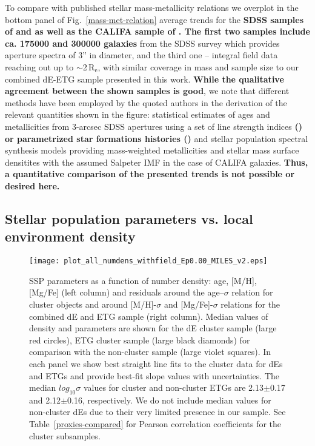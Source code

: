 \documentclass[useAMS,usenatbib]{mn2e}
\newcommand{\re}{$\mathrm{R_e}$}
\newcommand{\sig}{$\sigma$}
\begin{document}
To compare with published stellar mass-metallicity relations we overplot in the bottom panel of Fig.~\ref{mass-met-relation} average trends for the \textbf{SDSS samples of \cite{gallazzi:2005} and \cite{panter:2008} as well as the CALIFA sample of \cite{gonzalezdelgado:2014b}. The first two samples include ca. 175000  and 300000 galaxies} from the SDSS survey which provides aperture spectra of 3'' in diameter, and the third one -- integral field data reaching out up to $\sim$2\,{\re}, with similar coverage in mass and sample size to our combined dE-ETG sample presented in this work. \textbf{While the qualitative agreement between the shown samples is good}, we note that different methods have been employed by the quoted authors in the derivation of the relevant quantities shown in the figure: statistical estimates of ages and metallicities from 3-arcsec SDSS apertures using a set of line strength indices  \textbf{(\citealt{gallazzi:2005}) or parametrized star formations histories (\citealt{panter:2008})} and stellar population spectral synthesis models providing mass-weighted metallicities and stellar mass surface densitites with the assumed Salpeter IMF in the case of CALIFA galaxies. \textbf{Thus, a quantitative comparison of the presented trends is not possible or desired here.} 

\subsection{Stellar population parameters vs. local environment density}

\begin{figure*}
\centering
\texttt{[image: plot\_all\_numdens\_withfield\_Ep0.00\_MILES\_v2.eps]}
\caption{SSP parameters as a function of number density: age, [M/H], [Mg/Fe] (left column) and residuals around the age--{\sig} relation for cluster objects and around [M/H]-{\sig} and [Mg/Fe]-{\sig} relations for the combined dE and ETG sample (right column). Median values of density and parameters are shown for the dE cluster sample (large red circles), ETG cluster sample (large black diamonds) for comparison with the non-cluster sample (large violet squares). In each panel we show best straight line fits to the cluster data for dEs and ETGs and provide best-fit slope values with uncertainties. The median $log_{10}${\sig} values for cluster and non-cluster ETGs are 2.13$\pm$0.17 and 2.12$\pm$0.16, respectively. We do not include median values for non-cluster dEs due to their very limited presence in our sample. See Table~\ref{proxies-compared} for Pearson correlation coefficients for the cluster subsamples.}
\label{density_relations}  
\end{figure*}
\end{document}
